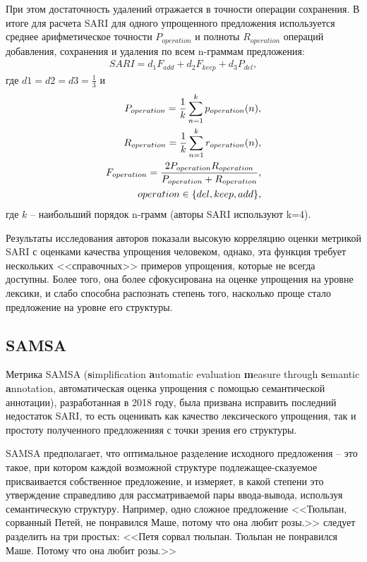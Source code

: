 При этом достаточность удалений отражается в точности операции сохранения. 
В итоге для расчета SARI для одного упрощенного предложения используется среднее арифметическое точности $P_{operation}$ и полноты $R_{operation}$ операций добавления, сохранения и удаления по всем n-граммам предложения:
\begin{eqnarray} 
	\label{eq:13}
	SARI = d_{1}F_{add} + d_{2}F_{keep} + d_{3}P_{del} ,
\end{eqnarray}
где $d1 = d2 = d3 = \frac{1}{3}$ и 
\begin{eqnarray} 
	\label{eq:14}
	P_{operation} = \frac{1}{k}\sum\limits_{n=1}^{k}p_{operation}(n) ,\\
	R_{operation} = \frac{1}{k}\sum\limits_{n=1}^{k}r_{operation}(n) ,\\
	F_{operation} = \frac{2P_{operation}R_{operation}}{P_{operation} + R_{operation}},  \\
	operation\in{\left\lbrace del, keep, add\right\rbrace } \notag,
\end{eqnarray}
где $k$ -- наибольший порядок n-грамм (авторы SARI используют k=4).

Результаты исследования авторов показали высокую корреляцию оценки метрикой SARI с оценками качества упрощения человеком, однако, эта функция требует нескольких <<справочных>> примеров упрощения, которые не всегда доступны. Более того, она более сфокусирована на оценке упрощения на уровне лексики, и слабо способна распознать степень того, насколько проще стало предложение на уровне его структуры.

\subsection{SAMSA}

Метрика SAMSA (\textbf{s}implification \textbf{a}utomatic evaluation \textbf{m}easure through \textbf{s}emantic \textbf{a}nnotation, автоматическая оценка упрощения с помощью семантической аннотации), разработанная в 2018 году, была призвана исправить последний недостаток SARI, то есть оценивать как качество лексического упрощения, так и простоту полученного предложенияя с точки зрения его структуры\cite{sulem_semantic_2018}.

SAMSA предполагает, что оптимальное разделение исходного предложения -- это такое, при котором каждой возможной структуре подлежащее-сказуемое присваивается собственное предложение, и измеряет, в какой степени это утверждение справедливо для рассматриваемой пары ввода-вывода, используя семантическую структуру. Например, одно сложное предложение <<Тюльпан, сорванный Петей, не понравился Маше, потому что она любит розы.>> следует разделить на три простых: <<Петя сорвал тюльпан. Тюльпан не понравился Маше. Потому что она любит розы.>>

